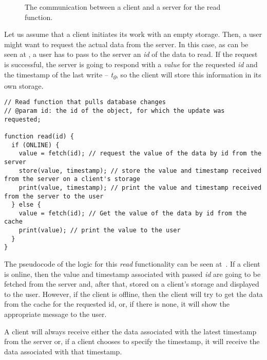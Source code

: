 \begin{figure}[!htb]
    \begin{center}
    \def\svgwidth{\linewidth}
    
    \caption {The communication between a client and a server for the read function.}
    \label{fig:design2}
\end{center}
\end{figure}

Let us assume that a client initiates its work with an empty storage. Then, a user might want to request the actual data from the server. In this case, as can be seen at , a user has to pass to the server an \textit{id} of the data to read. If the request is successful, the server is going to respond with a \textit{value} for the requested \textit{id} and the timestamp of the last write -- \textit{t\textsubscript{0}}, so the client will store this information in its own storage.

\begin{lstlisting}[caption={Pseudocode for requesting the data: client.}, label={lst:read1}]
// Read function that pulls database changes
// @param id: the id of the object, for which the update was requested;

function read(id) {
  if (ONLINE) {
    value = fetch(id); // request the value of the data by id from the server
    store(value, timestamp); // store the value and timestamp received from the server on a client's storage
    print(value, timestamp); // print the value and timestamp received from the server to the user
  } else {
    value = fetch(id); // Get the value of the data by id from the cache
    print(value); // print the value to the user
  }
}
\end{lstlisting} 

The pseudocode of the logic for this \textit{read} functionality can be seen at~. If a client is online, then the value and timestamp associated with passed \textit{id} are going to be fetched from the server and, after that, stored on a client's storage and displayed to the user. However, if the client is offline, then the client will try to get the data from the cache for the requested id, or, if there is none, it will show the appropriate message to the user.

A client will always receive either the data associated with the latest timestamp from the server or, if a client chooses to specify the timestamp, it will receive the data associated with that timestamp. 

